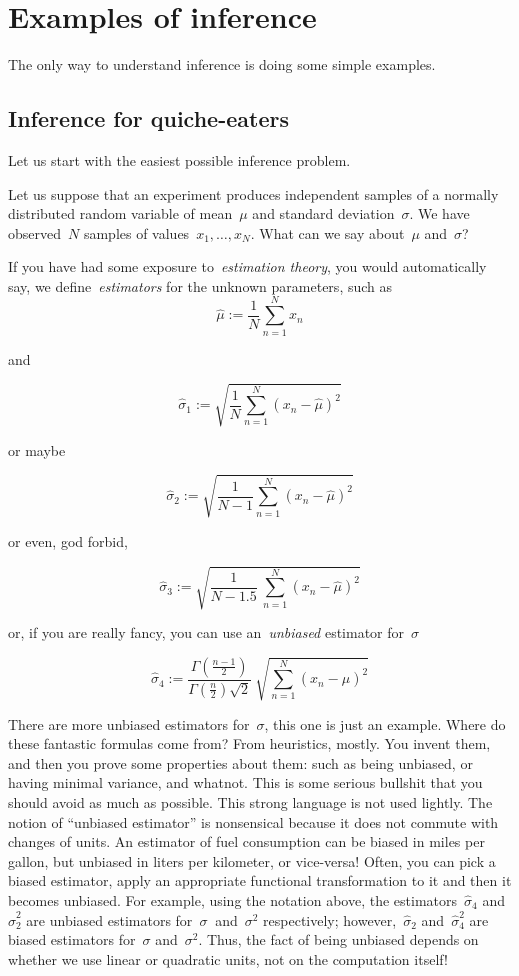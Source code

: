 \section{Examples of inference}

The only way to understand inference is doing some simple examples.

\subsection{Inference for quiche-eaters}

Let us start with the easiest possible inference problem.

Let us suppose that an experiment produces independent samples of a normally
distributed random variable of mean~$\mu$ and standard deviation~$\sigma$.
We have observed~$N$ samples of values~$x_1,\ldots,x_N$.  What can we say
about~$\mu$ and~$\sigma$?

If you have had some exposure to~\emph{estimation theory}, you would
automatically say, we define~\emph{estimators} for the unknown parameters,
such as
$$
\hat\mu :=\frac{1}{N}\sum_{n=1}^N x_n
$$

and

$$
\hat\sigma_1 :=\sqrt{\frac{1}{N}\sum_{n=1}^N (x_n-\hat\mu)^2}
$$

or maybe

$$
\hat\sigma_2 :=\sqrt{\frac{1}{N-1}\sum_{n=1}^N (x_n-\hat\mu)^2}
$$

or even, god forbid,

$$
\hat\sigma_3 :=\sqrt{\frac{1}{N-1.5}\ \sum_{n=1}^N (x_n-\hat\mu)^2}
$$

or, if you are really fancy, you can use an~\emph{unbiased} estimator
for~$\sigma$

$$
\hat\sigma_4
:=\frac{\Gamma\left(\frac{n-1}{2}\right)}{\Gamma\left(\frac{n}{2}\right)\sqrt{2}}\ \sqrt{\sum_{n=1}^N (x_n-\hat\mu)^2}
$$

There are more unbiased estimators for~$\sigma$, this one is just an example.
Where do these fantastic formulas come from? From heuristics, mostly.  You
invent them, and then you prove some properties about them: such as being
unbiased, or having minimal variance, and whatnot.  This is some serious
bullshit that you should avoid as much as possible.  This strong language is
not used lightly.  The notion of ``unbiased estimator'' is
nonsensical because it does not commute with changes of units.  An estimator
of fuel consumption can be biased in miles per gallon, but unbiased in liters
per kilometer, or vice-versa!  Often, you can pick a biased estimator, apply
an appropriate functional transformation to it and then it becomes unbiased.
For example, using the notation above, the estimators~$\hat\sigma_4$
and~$\hat\sigma_2^2$ are unbiased estimators for~$\sigma~$ and~$\sigma^2$
respectively; however,~$\hat\sigma_2$ and~$\hat\sigma_4^2$ are biased
estimators for~$\sigma$ and~$\sigma^2$.  Thus, the fact of being unbiased
depends on whether we use linear or quadratic units, not on the computation
itself!

